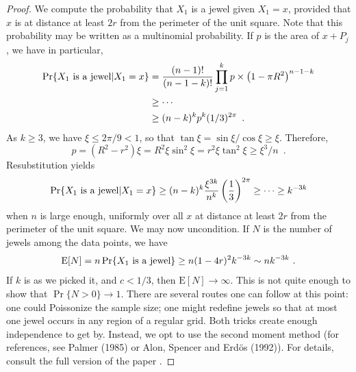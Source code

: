 \documentclass[10pt]{llncs}
\newcommand{\PROB}{\Pr}
\newcommand{\EXP}{\mathrm{E}}
\begin{document}
\begin{proof}
We compute the probability that $X_1$ is a jewel
given $X_1 = x$, provided that $x$ is at distance at
least $2r$ from the perimeter of the unit square.
Note that this probability may be written as
a multinomial probability. If $p$ is the area
of $x+P_j$, we have in particular,
\[
\begin{aligned}
\PROB \{ X_1 ~\hbox{\rm is a jewel} | X_1 = x \}
&=  {(n-1)! \over (n-1-k)!} \prod_{j=1}^k p \times \left( 1 - \pi R^2 \right)^{n-1-k} \\
&\ge \cdots \\
&\ge  (n-k)^k p^k (1/3)^{2\pi} \enspace . 
\end{aligned}
\]
As $k \ge 3$, we have $\xi \le 2\pi/9 < 1$, so that
$\tan \xi = \sin \xi / \cos \xi \ge \xi$.
Therefore, 
\[
p = (R^2 - r^2) \xi = R^2 \xi \sin^2 \xi
  = r^2 \xi \tan^2 \xi \ge \xi^3/n \enspace .
\]
Resubstitution yields
\[
\PROB \{ X_1 ~\hbox{\rm is a jewel} | X_1 = x \}
 \ge (n-k)^k {\xi^{3k} \over n^k} \left( {1 \over 3} \right)^{2\pi} 
\ge \cdots
 \ge k^{-3k}
\]
when $n$ is large enough, uniformly over all $x$
at distance at least $2r$ from the perimeter of the unit square.
We may now uncondition. If $N$ is the 
number of jewels among the data points, we have
\[
\EXP[N]
 = n \PROB \{ X_1 ~\hbox{\rm is a jewel} \}
 \ge n (1-4r)^2 k^{-3k}
 \sim n k^{-3k}~.
\]
If $k$ is as we picked it, and $c < 1/3$,
then $\EXP[N] \to \infty$.
This is not quite enough to show that 
$\PROB \{ N > 0 \} \to 1$.
There are several routes one can follow at this
point: one could Poissonize the sample
size; one might redefine jewels so that
at most one jewel occurs in any region of
a regular grid. Both tricks create
enough independence to get by.
Instead, we opt to use the second moment
method (for references, see Palmer (1985) or
Alon, Spencer and Erd\"os (1992)). 
For details, consult the full version of the paper \cite{dgm09}.


\end{proof}
\end{document}
